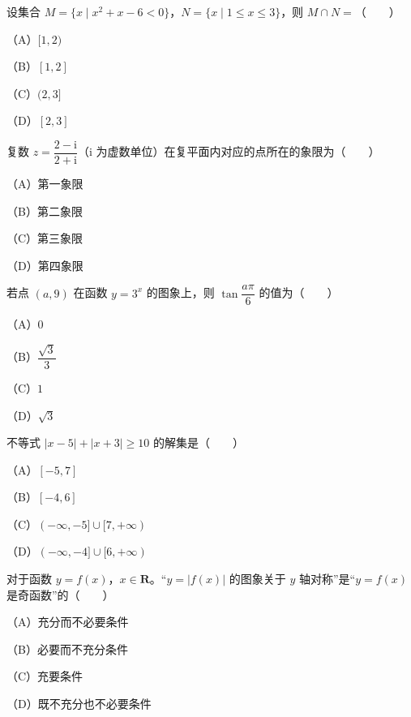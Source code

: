 

\begin{question}
设集合 $M=\{x\mid x^2+x-6<0\}$，$N=\{x\mid 1\leqslant x\leqslant 3\}$，则 $M\cap N=$\mbox{（　　）}

（A）$[1,2)$

（B）$[1,2]$

（C）$(2,3]$

（D）$[2,3]$

\end{question}
\begin{question}
复数 $z=\dfrac{2-\mathrm i}{2+\mathrm i}$（$\mathrm i$ 为虚数单位）在复平面内对应的点所在的象限为\mbox{（　　）}

（A）第一象限

（B）第二象限

（C）第三象限

（D）第四象限

\end{question}
\begin{question}
若点 $(a,9)$ 在函数 $y=3^x$ 的图象上，则 $\tan\dfrac{a\pi}{6}$ 的值为\mbox{（　　）}

（A）$0$

（B）$\dfrac{\sqrt3}{3}$

（C）$1$

（D）$\sqrt3$

\end{question}
\begin{question}
不等式 $|x-5|+|x+3|\geqslant10$ 的解集是\mbox{（　　）}

（A）$[-5,7]$

（B）$[-4,6]$

（C）$(-\infty,-5]\cup[7,+\infty)$

（D）$(-\infty,-4]\cup[6,+\infty)$

\end{question}
\begin{question}
对于函数 $y=f(x)$，$x\in\mathbf R$。“$y=|f(x)|$ 的图象关于 $y$ 轴对称”是“$y=f(x)$ 是奇函数”的\mbox{（　　）}

（A）充分而不必要条件

（B）必要而不充分条件

（C）充要条件

（D）既不充分也不必要条件

\end{question}
